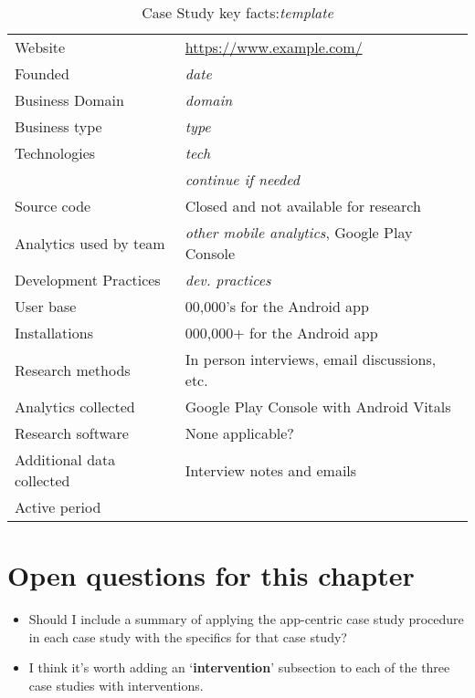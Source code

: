 {\renewcommand{\arraystretch}{0.8}%
\begin{table}[htbp!]
    \centering
    \small
    \setlength{\tabcolsep}{1pt}
    \begin{tabular}{ll}
       \toprule
       Website &\url{https://www.example.com/} \\
       Founded &\emph{date}\\
       Business Domain &\emph{domain}\\
       Business type &\emph{type}\\
       Technologies  &\emph{tech}\\
       &\emph{continue if needed} \\
       Source code  &Closed and not available for research \\
       Analytics used by team &\emph{other mobile analytics}, Google Play Console \\
       Development Practices &\emph{dev. practices}\\
       \midrule
       User base & 00,000's for the Android app \\
       Installations & 000,000+ for the Android app \\
       \midrule
       Research methods &In person interviews, email discussions, etc. \\
       Analytics collected &Google Play Console with Android Vitals \\
       Research software & None applicable? \\
       Additional data collected &Interview notes and emails \\
       Active period & \\
       \bottomrule
    \end{tabular}
    \caption{Case Study key facts:\emph{template}}
    \label{tab:blank_case_study_anaytics_overview}
\end{table}
}

\section{Open questions for this chapter}
{\small
\begin{itemize}
    \itemsep0em
    \item Should I include a summary of applying the app-centric case study procedure in each case study with the specifics for that case study?
    \item I think it's worth adding an `\textbf{intervention}' subsection to each of the three case studies with interventions.
\end{itemize}
}  %


